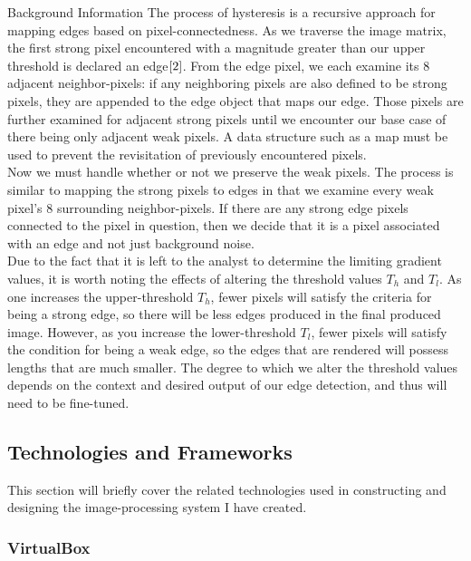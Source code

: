 \documentclass[a4paper,12pt]{article}
\begin{document}
\begin{section}{Background Information}
The process of hysteresis is a recursive approach for mapping edges based on pixel-connectedness. As we traverse the image matrix, the first strong pixel encountered with a magnitude greater than our upper threshold is declared an edge$\cite{2}$.%
From the edge pixel, we each examine its 8 adjacent neighbor-pixels: if any neighboring pixels are also defined to be strong pixels, they are appended to the edge object that maps our edge.
Those pixels are further examined for adjacent strong pixels until we encounter our base case of there being only adjacent weak pixels.
A data structure such as a map must be used to prevent the revisitation of previously encountered pixels.\\
Now we must handle whether or not we preserve the weak pixels.
The process is similar to mapping the strong pixels to edges in that we examine every weak pixel's 8 surrounding neighbor-pixels. 
If there are any strong edge pixels connected to the pixel in question, then we decide that it is a pixel associated with an edge and not just background noise.\\

Due to the fact that it is left to the analyst to determine the limiting gradient values, it is worth noting the effects of altering the threshold values $T_h$ and $T_l$.
As one increases the upper-threshold $T_h$, fewer pixels will satisfy the criteria for being a strong edge, so there will be less edges produced in the final produced image.
However, as you increase the lower-threshold $T_l$, fewer pixels will satisfy the condition for being a weak edge, so the edges that are rendered will possess lengths that are much smaller.
The degree to which we alter the threshold values depends on the context and desired output of our edge detection, and thus will need to be fine-tuned.

\newpage
\subsection{Technologies and Frameworks}

This section will briefly cover the related technologies used in constructing and designing the image-processing system I have created.

\singlespacing

\subsubsection{VirtualBox}



\end{section}
\end{document}
